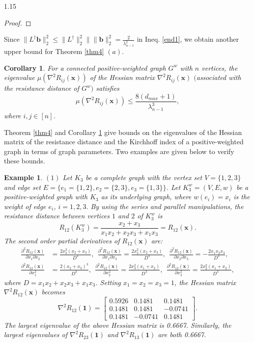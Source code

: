 \documentclass[preprint,12pt]{elsarticle1}
\newtheorem{cor}[thm]{Corollary}
\newtheorem{example}[thm]{Example}
\numberwithin{equation}{section}
\begin{document}
\begin{spacing}{1.15}
\begin{proof}
\end{proof}
Since  $\|L^{\dag}\textbf{b}\|_{2}^{2}\leq \|L^{\dag}\|_{2}^{2}\|\|\textbf{b}\|_{2}^{2}
  =\frac{2}{\lambda_{n-1}^{2}}$  in Ineq. \eqref{end1},  we obtain another upper bound for Theorem \ref{thm4} $(a)$.
\begin{cor}\label{cor1}
  For a connected  positive-weighted graph $G^{w}$ with $n$ vertices, the eigenvalue $\mu(\nabla^{2}R_{ij}(\mathbf{x}))$ of the Hessian matrix $\nabla^{2}R_{ij}(\mathbf{x})$ $($associated with  the resistance distance of $G^{w}$$)$ satisfies
$$\mu(\nabla^{2}R_{ij}(\mathbf{x}))\leq \frac{8(d_{max}+1)}{\lambda_{n-1}^3},$$
where  $i,j\in[n]$.
\end{cor}
 Theorem \ref{thm4} and Corollary \ref{cor1} give  bounds on the eigenvalues of the Hessian matrix of the resistance distance and the Kirchhoff index of a  positive-weighted graph in terms of graph parameters. Two examples are given below to verify these bounds.


\begin{example}\label{rem3.6}
$(1)$ Let $K_{3}$ be a complete graph with the vertex set $V=\{1,2,3\}$ and edge set $E=\{e_{1}=\{1,2\},e_{2}=\{2,3\},e_{3}=\{1,3\}\}$.
Let $K_{3}^{w}=(V,E,w)$ be a positive-weighted graph with $K_{3}$ as its underlying graph, where  $w(e_{i})=x_{i}$ is the weight of edge $e_{i}$, $i=1,2,3.$ By using the series and parallel manipulations, the resistance distance between vertices $1$ and $2$ of
$K_{3}^{w}$ is
$$R_{12}(K_{3}^{w})=
\frac{x_{2}+x_{3}}{x_{1}x_{2}+x_{2}x_{3}+x_{1}x_{3}}=R_{12}(\mathbf{x}).$$
The second order partial derivatives of $R_{12}(\mathbf{x})$ are:
\begin{align}\nonumber \frac{\partial^{2} R_{12}(\mathbf{x})}{\partial x_{1}\partial x_{2}}&=
\frac{2x_{3}^{2}(x_{2}+x_{3})}
{D^{3}},\ \ \frac{\partial^{2} R_{12}(\mathbf{x})}{\partial x_{1}\partial x_{3}}=\frac{2x_{2}^{2}(x_{2}+x_{3})}
{D^{3}},\ \
\frac{\partial^{2} R_{12}(\mathbf{x})}{\partial x_{2}\partial x_{3}}=-\frac{2x_{1}x_{2}x_{3}}
{D^{3}},\\ \nonumber
\frac{\partial^{2} R_{12}(\mathbf{x})}{\partial x_{1}^{2}}&=
\frac{2(x_{2}+x_{3})^{3}}
{D^{3}},\ \ \frac{\partial^{2} R_{12}(\mathbf{x})}{\partial x_{2}^{2}}=
\frac{2x_{3}^{2}(x_{1}+x_{2})}
{D^{3}},\ \ \frac{\partial^{2} R_{12}(\mathbf{x})}{\partial x_{3}^{2}}=
\frac{2x_{2}^{2}(x_{1}+x_{2})}
{D^{3}},
\end{align}
where $D=x_{1}x_{2}+x_{2}x_{3}+x_{1}x_{3}$. Setting $x_{1}=x_{2}=x_{3}=1$, the Hessian matrix
$\nabla^{2}R_{12}(\mathbf{x})$ becomes
$$\nabla^{2}R_{12}(\mathbf{1})=\left[\begin{array}{ccc}
0.5926  &  0.1481  &  0.1481\\
    0.1481 &   0.1481 &  -0.0741\\
    0.1481 &  -0.0741  &  0.1481
    \end{array}
\right].$$
The largest eigenvalue of the above Hessian matrix is
0.6667.
Similarly, the largest eigenvalues of $\nabla^{2}R_{23}(\mathbf{1})$ and
$\nabla^{2}R_{13}(\mathbf{1})$ are both
0.6667.




\end{example}
\end{spacing}
\end{document}
